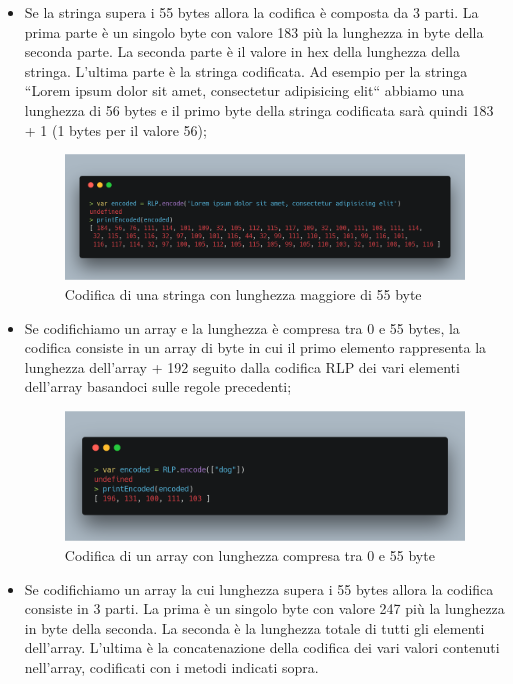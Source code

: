 \documentclass[12pt]{report}
\begin{document}
\begin{itemize}
\item Se la stringa supera i 55 bytes allora la codifica è composta da 3 parti. 
La prima parte è un singolo byte con valore 183 più la lunghezza in byte della seconda parte. 
La seconda parte è il valore in hex della lunghezza della stringa. L'ultima parte è la stringa codificata.
Ad esempio per la stringa ``Lorem ipsum dolor sit amet, consectetur adipisicing elit`` abbiamo una lunghezza di 56 bytes e il primo byte della stringa codificata sarà quindi 183 + 1 (1 bytes per il valore 56);
\begin{figure}[H]
    \centering\includegraphics[width=\textwidth]{carbon-4}
    \caption{Codifica di una stringa con lunghezza maggiore di 55 byte}
\end{figure}


\item Se codifichiamo un array e la lunghezza è compresa tra 0 e 55 bytes, la codifica consiste in un array di byte in cui il primo elemento rappresenta la lunghezza dell'array + 192 seguito dalla codifica RLP dei vari elementi dell'array basandoci sulle regole precedenti;

\begin{figure}[H]
    \centering\includegraphics[width=\textwidth]{carbon-5}
    \caption{Codifica di un array con lunghezza compresa tra 0 e 55 byte}
\end{figure}


\item Se codifichiamo un array la cui lunghezza supera i 55 bytes allora la codifica consiste in 3 parti.
La prima è un singolo byte con valore 247 più la lunghezza in byte della seconda.
La seconda è la lunghezza totale di tutti gli elementi dell'array.
L'ultima è la concatenazione della codifica dei vari valori contenuti nell'array, codificati con i metodi indicati sopra.



\end{itemize}
\newpage
\end{document}
